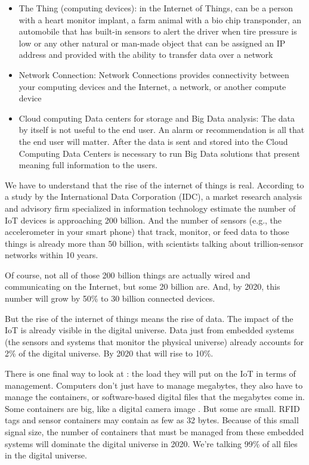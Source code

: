 \begin{itemize}
\item The Thing (computing devices):  in the Internet 
of Things, can be a person with a heart monitor implant, a farm animal with a 
bio chip transponder, an automobile that has built-in sensors to alert the driver 
when tire pressure is low or any other natural or man-made object that can be 
assigned an IP address and provided with the ability to transfer data over a 
network
\item Network Connection: Network Connections provides connectivity between your 
computing devices  and the Internet, a network, or another compute device 

\item Cloud computing Data centers for storage and Big Data analysis: The data 
by itself is not useful to the end user. An alarm or recommendation is all that 
the end user will matter. After the data is sent and stored into the Cloud 
Computing Data Centers is necessary to run Big Data solutions that present 
meaning full information to the users.
\end{itemize}

We have to understand that the rise of the internet of things is real. According 
to a study by the International Data Corporation (IDC), a market research 
analysis and advisory firm specialized in information technology estimate the 
number of IoT devices is approaching  200 billion. And the number of sensors 
(e.g., the accelerometer in your smart phone) that track, monitor, or feed data 
to those things is already more than 50 billion, with scientists talking about 
trillion-sensor networks within 10 years.

Of course, not all of those 200 billion things are actually wired and 
communicating on the Internet, but some 20 billion are. And, by 2020, this 
number will grow by 50\% to 30 billion connected devices.

But the rise of the internet of things means the rise of data. The impact of the 
IoT is already visible in the digital universe. Data just from embedded systems 
(the sensors and systems that monitor the physical universe) already accounts 
for 2\% of the digital universe. By 2020 that will rise to 10\%.

There is one final way to look at : the load they will put on the IoT in terms 
of management. Computers don't just have to manage megabytes, they also have 
to manage the containers, or software-based digital files that the megabytes 
come in. Some containers are big, like a digital camera image . But some are 
small. RFID tags and sensor containers may contain as few as 32 bytes. Because 
of this small signal size, the number of containers that must be managed from 
these embedded systems will dominate the digital universe in 2020. We’re 
talking 99\% of all files in the digital universe.

